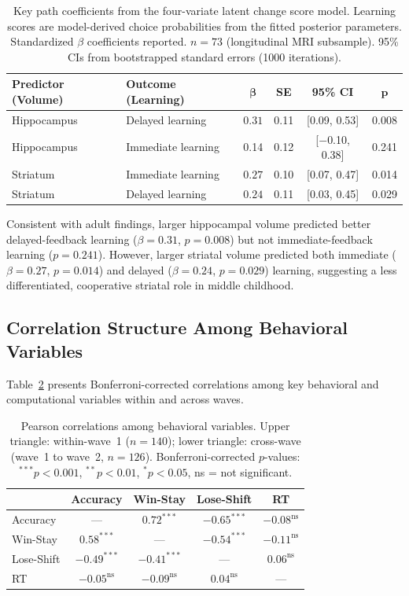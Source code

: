 \documentclass[11pt]{article}
\begin{document}
\begin{table}[H]
\centering
\caption{Key path coefficients from the four-variate latent change score model. Learning scores are model-derived choice probabilities from the fitted posterior parameters. Standardized $\beta$ coefficients reported. $n = 73$ (longitudinal MRI subsample). 95\% CIs from bootstrapped standard errors (1000 iterations).}
\label{tab:lcs_results}
\begin{tabular}{llcccc}
\toprule
\textbf{Predictor (Volume)} & \textbf{Outcome (Learning)} & $\boldsymbol{\beta}$ & \textbf{SE} & \textbf{95\% CI} & $\boldsymbol{p}$ \\
\midrule
Hippocampus & Delayed learning & $\mathbf{0.31}$ & 0.11 & [0.09, 0.53] & 0.008 \\
Hippocampus & Immediate learning & 0.14 & 0.12 & [$-$0.10, 0.38] & 0.241 \\
Striatum & Immediate learning & $\mathbf{0.27}$ & 0.10 & [0.07, 0.47] & 0.014 \\
Striatum & Delayed learning & $\mathbf{0.24}$ & 0.11 & [0.03, 0.45] & 0.029 \\
\bottomrule
\end{tabular}
\end{table}

Consistent with adult findings, larger hippocampal volume predicted better delayed-feedback learning ($\beta = 0.31$, $p = 0.008$) but not immediate-feedback learning ($p = 0.241$). However, larger striatal volume predicted both immediate ($\beta = 0.27$, $p = 0.014$) and delayed ($\beta = 0.24$, $p = 0.029$) learning, suggesting a less differentiated, cooperative striatal role in middle childhood.

\subsection{Correlation Structure Among Behavioral Variables}

Table~\ref{tab:correlations} presents Bonferroni-corrected correlations among key behavioral and computational variables within and across waves.

\begin{table}[H]
\centering
\caption{Pearson correlations among behavioral variables. Upper triangle: within-wave~1 ($n = 140$); lower triangle: cross-wave (wave~1 to wave~2, $n = 126$). Bonferroni-corrected $p$-values: $^{***}p < 0.001$, $^{**}p < 0.01$, $^{*}p < 0.05$, ns = not significant.}
\label{tab:correlations}
\begin{tabular}{lcccc}
\toprule
& \textbf{Accuracy} & \textbf{Win-Stay} & \textbf{Lose-Shift} & \textbf{RT} \\
\midrule
Accuracy & --- & $0.72^{***}$ & $-0.65^{***}$ & $-0.08^{\text{ns}}$ \\
Win-Stay & $0.58^{***}$ & --- & $-0.54^{***}$ & $-0.11^{\text{ns}}$ \\
Lose-Shift & $-0.49^{***}$ & $-0.41^{***}$ & --- & $0.06^{\text{ns}}$ \\
RT & $-0.05^{\text{ns}}$ & $-0.09^{\text{ns}}$ & $0.04^{\text{ns}}$ & --- \\
\bottomrule
\end{tabular}
\end{table}
\end{document}

